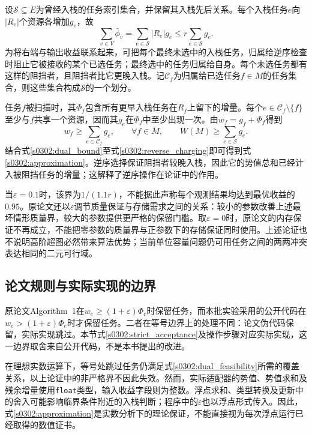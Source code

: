 设$\mathcal{S}\subseteq E$为曾经入栈的任务索引集合，并保留其入栈先后关系。每个入栈任务$e$向$|R_e|$个资源各增加$g_e$，故
\begin{equation}
 \sum_{v\in V}\bar\phi_v
 =\sum_{e\in\mathcal{S}}|R_e|g_e
 \leq r\sum_{e\in\mathcal{S}}g_e.
\label{s0302:potential_accounting}
\end{equation}
为将右端与输出收益联系起来，可把每个最终未选中的入栈任务，归属给逆序检查时阻止它被接收的某个已选任务；最终选中的任务归属给自身。每个未选任务都有这样的阻挡者，且阻挡者比它更晚入栈。记$\mathcal{C}_f$为归属给已选任务$f\in M$的任务集合，则这些集合构成$\mathcal{S}$的一个划分。

任务$f$被扫描时，其$\Phi_f$包含所有更早入栈任务在$R_f$上留下的增量。每个$e\in\mathcal{C}_f\setminus\{f\}$至少与$f$共享一个资源，因而其$g_e$在$\Phi_f$中至少出现一次。由$w_f=g_f+\Phi_f$得到
\begin{equation}
 w_f\geq\sum_{e\in\mathcal{C}_f}g_e,
 \qquad\forall f\in M,
 \qquad
 W(M)\geq\sum_{e\in\mathcal{S}}g_e.
\label{s0302:reverse_charging}
\end{equation}
结合式\eqref{s0302:dual_bound}至式\eqref{s0302:reverse_charging}即可得到式\eqref{s0302:approximation}。逆序选择保证阻挡者较晚入栈，因此它的势值总和已经计入被阻挡任务的增量；这解释了逆序操作在论证中的作用。

当$\varepsilon=0.1$时，该界为$1/(1.1r)$，不能据此声称每个观测结果均达到最优收益的$0.95$。原论文还以$\varepsilon$调节质量保证与存储需求之间的关系：较小的参数改善上述最坏情形质量界，较大的参数提供更严格的保留门槛。取$\varepsilon=0$时，原论文的内存保证不再成立，不能把零参数的质量界与正参数下的存储保证同时使用。上述论证也不说明高阶超图必然带来算法优势；当前单位容量问题仍可用任务之间的两两冲突表达相同的二元可行域。

\subsection{论文规则与实际实现的边界}

原论文Algorithm~1在$w_e\geq(1+\varepsilon)\Phi_e$时保留任务，而本批实验采用的公开代码在$w_e>(1+\varepsilon)\Phi_e$时才保留任务。二者在等号边界上的处理不同：论文伪代码保留，实际实现跳过。本节式\eqref{s0302:strict_acceptance}及操作步骤对应实际实现，这一边界取舍来自公开代码，不是本书提出的改进。

在理想实数运算下，等号处跳过任务仍满足式\eqref{s0302:dual_feasibility}所需的覆盖关系，以上论证中的非严格界不因此失效。然而，实际适配器的势值、势值求和及残余增量使用\texttt{float}类型，输入收益字段则为整数。浮点求和、类型转换及更新中的舍入可能影响临界条件附近的入栈判断；程序中的$\varepsilon$也以浮点形式传入。因此，式\eqref{s0302:approximation}是实数分析下的理论保证，不能直接视为每次浮点运行已经取得的数值证书。

